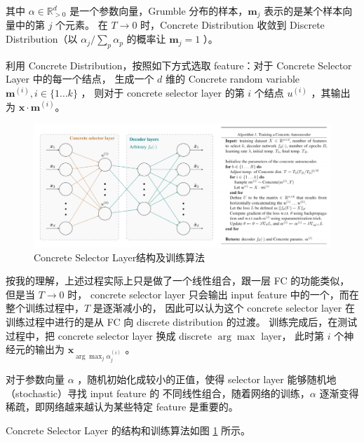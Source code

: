 \documentclass[UTF8]{ctexart}
\begin{document}
                其中 $\alpha \in \mathbb{R}^d_{>0}$ 是一个参数向量，Grumble 分布的样本，$\mathbf{m}_j$ 表示的是某个样本向量中的第 $j$ 个元素。
                在 $T \rightarrow 0$ 时，Concrete Distribution 收敛到 Discrete Distribution（以 $\alpha_j / \sum_p \alpha_p$ 的概率让 $\mathbf{m}_j = 1$ ）。

                利用 Concrete Distribution，按照如下方式选取 feature：对于 Concrete Selector Layer 中的每一个结点，
                生成一个 $d$ 维的 Concrete random variable $\mathbf{m}^{(i)}, i \in \{1 \dots k\}$ ，
                则对于 concrete selector layer 的第 $i$ 个结点 $u^{(i)}$ ，其输出为 $\mathbf{x}\cdot \mathbf{m}^{(i)}$。

                \begin{figure}[ht]
                    \centering
                    \includegraphics[scale=0.36]{Week06_concrete.png}
                    \caption{Concrete Selector Layer结构及训练算法}
                    \label{fig:concrete}
                \end{figure}

                按我的理解，上述过程实际上只是做了一个线性组合，跟一层 FC 的功能类似，但是当 $T \rightarrow 0$ 时，
                concrete selector layer 只会输出 input feature 中的一个，而在整个训练过程中，$T$ 是逐渐减小的，
                因此可以认为这个 concrete selector layer 在训练过程中进行的是从 FC 向 discrete distribution 的过渡。
                训练完成后，在测试过程中，把 concrete selector layer 换成 discrete $\arg \max$ layer，
                此时第 $i$ 个神经元的输出为 $\mathbf{x}_{\arg \max_j \alpha_j^{(i)}}$ 。

                对于参数向量 $\alpha$ ，随机初始化成较小的正值，使得 selector layer 能够随机地（stochastic）寻找 input feature 的
                不同线性组合，随着网络的训练，$\alpha$ 逐渐变得稀疏，即网络越来越认为某些特定 feature 是重要的。

                Concrete Selector Layer 的结构和训练算法如图 \ref{fig:concrete} 所示。
\end{document}
